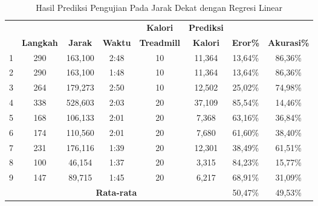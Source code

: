 \begin{longtable}{|c|c|c|c|c|c|c|c|}
  \caption{Hasil Prediksi Pengujian Pada Jarak Dekat dengan Regresi Linear}
  \label{tb:PengujianJarakDekatAnalisaPrediksiRegresi}                                   \\
  \hline
  \rowcolor[HTML]{C0C0C0}
  & & & & \textbf{Kalori} & \textbf{Prediksi} & & \\
  \rowcolor[HTML]{C0C0C0}
  \multirow{-2}{*}{\textbf{Percobaan}} & \multirow{-2}{*}{\textbf{Langkah}} & \multirow{-2}{*}{\textbf{Jarak}} & \multirow{-2}{*}{\textbf{Waktu}} & \textbf{Treadmill} & \textbf{Kalori} & \multirow{-2}{*}{\textbf{Eror\%}} & \multirow{-2}{*}{\textbf{Akurasi\%}} \\
  
  \hline
  1   & 290   & 163,100    & 2:48    & 10    & 11,364   & 13,64\%      & 86,36\%   \\
  \hline  
  2   & 290   & 163,100    & 1:48    & 10    & 11,364   & 13,64\%      & 86,36\%  \\
  \hline
  3   & 264   & 179,273    & 2:50    & 10    & 12,502   & 25,02\%      & 74,98\%   \\
  \hline
  4   & 338   & 528,603    & 2:03    & 20    & 37,109   & 85,54\%      & 14,46\%  \\
  \hline
  5   & 168   & 106,133    & 2:01    & 20    & 7,368    & 63,16\%      & 36,84\%    \\
  \hline
  6   & 174   & 110,560    & 2:01    & 20    & 7,680    & 61,60\%      & 38,40\%   \\
  \hline
  7   & 231   & 176,116    & 1:39    & 20    & 12,301   & 38,49\%      & 61,51\%   \\
  \hline
  8   & 100   & 46,154     & 1:37    & 20    & 3,315    & 84,23\%      & 15,77\%   \\
  \hline
  9   & 147   & 89,715     & 1:45    & 20    & 6,217    & 68,91\%      & 31,09\%   \\
  \hline

  \multicolumn{6}{|c|}{\textbf{Rata-rata}} & 50,47\% & 49,53\%  \\
  \hline
\end{longtable}

